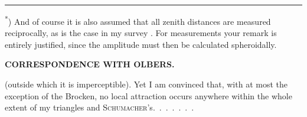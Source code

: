 \par\smallskip\noindent\rule{.24\textwidth}{.4pt}\par\smallskip
{\footnotesize
\noindent\hspace*{.06\linewidth}\textsuperscript{*}) And of course it is also assumed that all zenith distances are measured reciprocally, as is the case in my survey .
For  measurements your remark is entirely justified, since the amplitude must then be calculated spheroidally.\par
}

\clearpage
\noindent{}\hfill{\small\textbf{CORRESPONDENCE WITH OLBERS.}}\hfill\null\par\medskip
\noindent (outside which it is imperceptible).
Yet I am convinced that, with at most the exception of the Brocken, no  local attraction occurs anywhere within the whole extent of my triangles and \textsc{Schumacher}'s.\ \mbox{.\ .\ .\ .\ .\ .}
